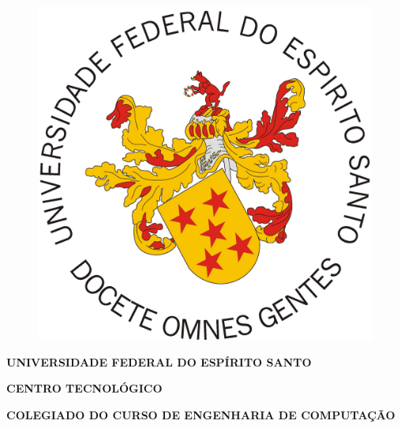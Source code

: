 \documentclass[
	12pt,				%
	openright,			%
	oneside,			%
	a4paper,			%
	english,			%
	french,				%
	spanish,			%
	brazil				%
	]{abntex2}
\begin{document}
\begin{figure}
  \centering
  \includegraphics[width=.20\textwidth]{figuras/brasao.jpg}
  \label{fig-brasao}
\end{figure}

\begin{center}
  \textbf{\textsf{UNIVERSIDADE FEDERAL DO ESPÍRITO SANTO}}

  \textbf{\textsf{CENTRO TECNOLÓGICO}}

  \textbf{\textsf{COLEGIADO DO CURSO DE ENGENHARIA DE COMPUTAÇÃO}}

  \large{\textbf{\textsf{  }}}

  \large{\textbf{\textsf{  }}}
\end{center}

\frenchspacing

\imprimircapa

\imprimirfolhaderosto*



%     
\end{document}
